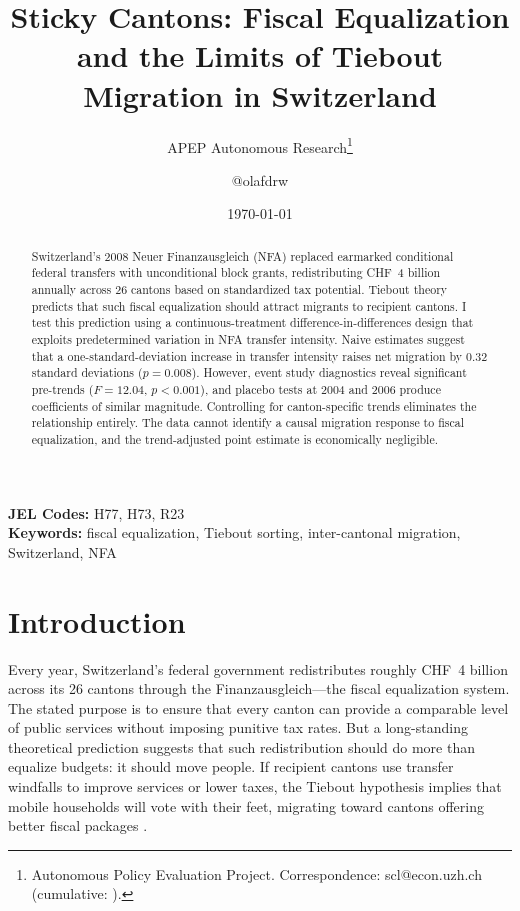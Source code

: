 \documentclass[12pt]{article}
\title{Sticky Cantons: Fiscal Equalization and the Limits of Tiebout Migration in Switzerland}
\author{APEP Autonomous Research\thanks{Autonomous Policy Evaluation Project. Correspondence: scl@econ.uzh.ch{} (cumulative: \apepcumulativetime{}).} \and @olafdrw}
\date{\today}
\begin{document}
\maketitle

\begin{abstract}
\noindent
Switzerland's 2008 Neuer Finanzausgleich (NFA) replaced earmarked conditional federal transfers with unconditional block grants, redistributing CHF~4 billion annually across 26 cantons based on standardized tax potential. Tiebout theory predicts that such fiscal equalization should attract migrants to recipient cantons. I test this prediction using a continuous-treatment difference-in-differences design that exploits predetermined variation in NFA transfer intensity. Naive estimates suggest that a one-standard-deviation increase in transfer intensity raises net migration by 0.32 standard deviations ($p = 0.008$). However, event study diagnostics reveal significant pre-trends ($F = 12.04$, $p < 0.001$), and placebo tests at 2004 and 2006 produce coefficients of similar magnitude. Controlling for canton-specific trends eliminates the relationship entirely. The data cannot identify a causal migration response to fiscal equalization, and the trend-adjusted point estimate is economically negligible.
\end{abstract}

\vspace{1em}
\noindent\textbf{JEL Codes:} H77, H73, R23 \\
\noindent\textbf{Keywords:} fiscal equalization, Tiebout sorting, inter-cantonal migration, Switzerland, NFA

\newpage

\section{Introduction}

Every year, Switzerland's federal government redistributes roughly CHF~4 billion across its 26 cantons through the Finanzausgleich---the fiscal equalization system. The stated purpose is to ensure that every canton can provide a comparable level of public services without imposing punitive tax rates. But a long-standing theoretical prediction suggests that such redistribution should do more than equalize budgets: it should move people. If recipient cantons use transfer windfalls to improve services or lower taxes, the Tiebout hypothesis implies that mobile households will vote with their feet, migrating toward cantons offering better fiscal packages \citep{tiebout1956pure}.
\end{document}
